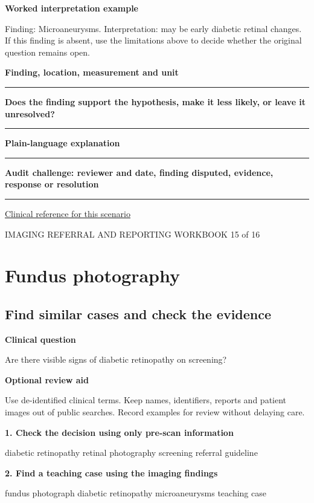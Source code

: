 \documentclass[11pt,a4paper]{article}
\newcommand{\record}[1]{\textbf{#1}\par\vspace{0.55\baselineskip}\hrule\vspace{0.35\baselineskip}}
\begin{document}
\textbf{Worked interpretation example}\par Finding: Microaneurysms. Interpretation: may be early diabetic retinal changes. If this finding is absent, use the limitations above to decide whether the original question remains open.\par

\record{Finding, location, measurement and unit}

\record{Does the finding support the hypothesis, make it less likely, or leave it unresolved?}

\record{Plain-language explanation}

\record{Audit challenge: reviewer and date, finding disputed, evidence, response or resolution}

\small\href{https://www.aaojournal.org/article/S0161-6420(19)32902-5/fulltext/}{Clinical reference for this scenario}

\normalsize

\newpage

{\small IMAGING REFERRAL AND REPORTING WORKBOOK \hfill 15 of 16}

\section*{Fundus photography}

\subsection*{Find similar cases and check the evidence}

\textbf{Clinical question}\par Are there visible signs of diabetic retinopathy on screening?\par

\textbf{Optional review aid}\par Use de-identified clinical terms. Keep names, identifiers, reports and patient images out of public searches. Record examples for review without delaying care.\par

\textbf{1. Check the decision using only pre-scan information}\par diabetic retinopathy retinal photography screening referral guideline\par

\textbf{2. Find a teaching case using the imaging findings}\par fundus photograph diabetic retinopathy microaneurysms teaching case\par
\end{document}
